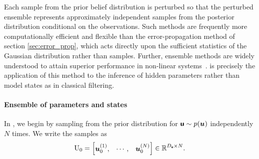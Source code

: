 Each sample from the prior belief distribution is perturbed so that the perturbed ensemble represents approximately independent samples from the posterior distribution conditional on the observations.
Such methods are frequently more computationally efficient and flexible than the error-propagation method of section \ref{sec:error_prop}, which acts directly upon the sufficient statistics of the Gaussian distribution rather than samples.
Further, ensemble methods are widely understood to attain superior performance in non-linear systems~\citep{FearnheadParticle2018}.
\meth{} is precisely the application of this method to the inference of hidden parameters rather than model states as in classical filtering.

\paragraph{Ensemble of parameters and states}
In  \meth{}, we begin by sampling from the prior distribution for \(\boldsymbol{\mathsf{u}} \sim p(\boldsymbol{u})\) independently $N$ times.
We write the samples as
\begin{align*}
    \mathrm{U}_{0}= \begin{bmatrix}
        \boldsymbol{u}_{0}^{(1)}, & \cdots, & \boldsymbol{u}_{0}^{(N)}
    \end{bmatrix} \in \mathbb{R}^{D_{\boldsymbol{\mathsf{u}}}\times N}.
\end{align*}


